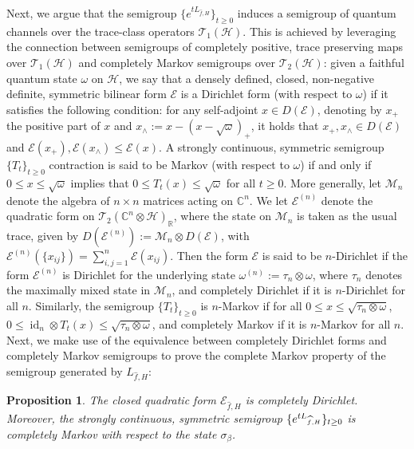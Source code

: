 \documentclass[11pt]{amsart}
\newcommand{\1}{\mathbbm{1}}
\theoremstyle{plain}
\newtheorem{proposition}[theorem]{Proposition}
\theoremstyle{definition}
\theoremstyle{remark}
\numberwithin{equation}{section}
\begin{document}
Next, we argue that the semigroup $\{e^{t L_{\widehat{f},H}}\}_{t\ge 0}$ induces a semigroup of quantum channels over the trace-class operators $\mathscr{T}_1(\mathcal{H})$. This is achieved by leveraging the connection between semigroups of completely positive, trace preserving maps over $\mathscr{T}_1(\mathcal{H})$ and completely Markov semigroups over $\mathscr{T}_2(\mathcal{H})$: given a faithful quantum state $\omega$ on $\mathcal{H}$, we say that a densely defined, closed, non-negative definite, symmetric bilinear form $\mathcal{E}$ is a Dirichlet form (with respect to $\omega$) if it satisfies the following condition: for any self-adjoint $x\in D(\mathcal{E})$, denoting by $x_+$ the positive part of $x$ and $x_\wedge:=x-(x-\sqrt{\omega})_+$, it holds that $x_+,x_\wedge\in D(\mathcal{E})$ and $
\mathcal{E}(x_+),\mathcal{E}(x_\wedge)\le \mathcal{E}(x)$.
A strongly continuous, symmetric semigroup $\{T_t\}_{t\ge 0}$ contraction is said to be Markov (with respect to $\omega$) if and only if $0\le x\le \sqrt{\omega}$ implies that $0\le T_t(x)\le \sqrt{\omega}$ for all $t\ge0$. More generally, let ${\mathscr{M}}_n$ denote the algebra of $n\times n$ matrices acting on $\mathbb{C}^n$. We let $\mathcal{E}^{(n)}$ denote the quadratic form on $\mathscr{T}_2(\mathbb{C}^n\otimes \mathcal{H})_{\mathbb{R}}$, where the state on ${\mathscr{M}}_n$ is taken as the usual trace, given by $D(\mathcal{E}^{(n)}):={\mathscr{M}}_n\otimes D(\mathcal{E})$, with $\mathcal{E}^{(n)}(\{x_{ij}\})=\sum_{i,j=1}^n\mathcal{E}(x_{ij})$.
Then the form $\mathcal{E}$ is said to be $n$-Dirichlet if the form $\mathcal{E}^{(n)}$ is Dirichlet for the underlying state $\omega^{(n)}:=\tau_n\otimes \omega$, where $\tau_n$ denotes the maximally mixed state in ${\mathscr{M}}_n$, and completely Dirichlet if it is $n$-Dirichlet for all $n$. Similarly, the semigroup $\{T_t\}_{t\ge 0}$ is $n$-Markov if for all $0\le x\le \sqrt{\tau_n\otimes \omega}$, $0\le \operatorname{id}_n\otimes T_t(x)\le \sqrt{\tau_n\otimes \omega}$, and completely Markov if it is $n$-Markov for all $n$. Next, we make use of the equivalence between completely Dirichlet forms and completely Markov semigroups \cite[Theorem 5.7]{Goldstein1995} to prove the complete Markov property of the semigroup generated by $L_{\widehat{f},H}$:
\begin{proposition}\label{GibbsDirichlet}
The closed quadratic form $\mathcal{E}_{\widehat{f},H}$ is completely Dirichlet. Moreover, the strongly continuous, symmetric semigroup $\{e^{\smash{tL_{\widehat{f},H}}}\}_{t\ge 0}$ is completely Markov with respect to the state $\sigma_\beta$.
\end{proposition}
\end{document}
